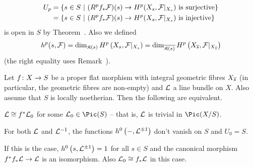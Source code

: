 \documentclass[a4paper,parskip=half,numbers=enddot, DIV=12]{scrreprt}
\begin{document}
\begin{align*}
	U_p&=\left\{s\in S\ \middle|\ (R^pf_*\mathcal{F})(s)\to H^p(X_s,\mathcal{F}|_{X_s})\text{ is surjective}\right\}\\
	&=\left\{s\in S\ \middle|\ (R^pf_*\mathcal{F})(s)\to H^p(X_s,\mathcal{F}|_{X_s})\text{ is injective}\right\}
\end{align*}
is open in $S$ by Theorem~. Also we defined
\begin{align*}
	h^p(s,\mathcal{F})=\dim_{\mathfrak{K}(s)}H^p\left(X_s,\mathcal{F}|_{X_s}\right)=\dim_{\overline{\mathfrak{K}(s)}}H^p\left(X_{\overline{s}},\mathcal{F}|_{X_{\overline{s}}}\right)
\end{align*}
(the right equality uses Remark~).
\begin{prop}
	Let $f\colon X\morphism S$ be a proper flat morphism with integral geometric fibres $X_{\overline{s}}$ (in particular, the geometric fibres are non-empty) and $\mathcal{L}$ a line bundle on $X$. Also assume that $S$ is locally noetherian. Then the following are equivalent.
	\begin{alphanumerate}
		\item $\mathcal{L}\cong f^*\mathcal{L}_0$ for some $\Ll_0\in\Pic(S)$ -- that is, $\mathcal{L}$ is trivial in $\Pic(X/S)$.
		\item For both $\mathcal{L}$ and $\mathcal{L}^{-1}$, the functions $h^0\left(-,\mathcal{L}^{\pm 1}\right)$ don't vanish on $S$ and $U_0=S$.
	\end{alphanumerate}
	If this is the case, $h^0\left(s,\mathcal{L}^{\pm1}\right)=1$ for all $s\in S$ and the canonical morphism $f^*f_*\Ll\morphism\Ll$ is an isomorphism. Also $\mathcal{L}_0\cong f_*\mathcal{L}$ in this case.
\end{prop}
\end{document}
